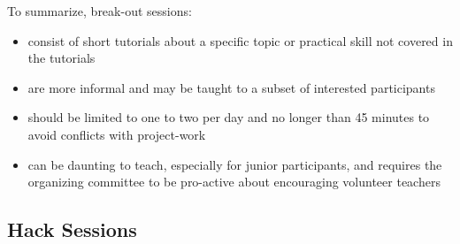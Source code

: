 \documentclass{nature}
\begin{document}
To summarize, break-out sessions:
\begin{itemize}
\item consist of short tutorials about a specific topic or practical skill not covered in the tutorials
\item are more informal and may be taught to a subset of interested participants
\item should be limited to one to two per day and no longer than 45 minutes to avoid conflicts with project-work
\item can be daunting to teach, especially for junior participants, and requires the organizing committee to be pro-active about encouraging volunteer teachers
\end{itemize}

\subsection{Hack Sessions}
\end{document}
